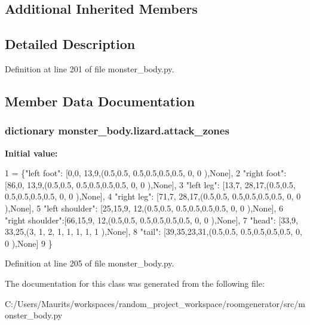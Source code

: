 \subsection*{Additional Inherited Members}


\subsection{Detailed Description}


Definition at line 201 of file monster\+\_\+body.\+py.



\subsection{Member Data Documentation}
\hypertarget{classmonster__body_1_1lizard_a5a110c2e0fc9241d947825096ded2d92}{}
\subsubsection[{attack\+\_\+zones}]{\setlength{\rightskip}{0pt plus 5cm}dictionary monster\+\_\+body.\+lizard.\+attack\+\_\+zones\hspace{0.3cm}{\ttfamily [static]}}\label{classmonster__body_1_1lizard_a5a110c2e0fc9241d947825096ded2d92}
{\bfseries Initial value\+:}
\begin{DoxyCode}
1 = \{\textcolor{stringliteral}{"left foot"}:     [0,0,  13,9,(0.5,0.5, 0.5,0.5,0.5,0.5,  0,  0  ),\textcolor{keywordtype}{None}],
2                   \textcolor{stringliteral}{"right foot"}:    [86,0, 13,9,(0.5,0.5, 0.5,0.5,0.5,0.5,  0,  0  ),\textcolor{keywordtype}{None}],
3                   \textcolor{stringliteral}{"left leg"}:      [13,7, 28,17,(0.5,0.5, 0.5,0.5,0.5,0.5,  0,  0 ),\textcolor{keywordtype}{None}],
4                   \textcolor{stringliteral}{"right leg"}:     [71,7, 28,17,(0.5,0.5, 0.5,0.5,0.5,0.5,  0,  0 ),\textcolor{keywordtype}{None}],
5                   \textcolor{stringliteral}{"left shoulder"}: [25,15,9, 12,(0.5,0.5, 0.5,0.5,0.5,0.5,  0,  0 ),\textcolor{keywordtype}{None}],
6                   \textcolor{stringliteral}{"right shoulder"}:[66,15,9, 12,(0.5,0.5, 0.5,0.5,0.5,0.5,  0,  0 ),\textcolor{keywordtype}{None}],
7                   \textcolor{stringliteral}{"head"}:          [33,9, 33,25,(3,  1,   2,  1,  1,  1,    1,  1 ),\textcolor{keywordtype}{None}],
8                   \textcolor{stringliteral}{"tail"}:          [39,35,23,31,(0.5,0.5, 0.5,0.5,0.5,0.5,  0,  0 ),\textcolor{keywordtype}{None}]
9                   \}
\end{DoxyCode}


Definition at line 205 of file monster\+\_\+body.\+py.



The documentation for this class was generated from the following file\+:\begin{DoxyCompactItemize}
\item 
C\+:/\+Users/\+Maurits/workspaces/random\+\_\+project\+\_\+workspace/roomgenerator/src/monster\+\_\+body.\+py\end{DoxyCompactItemize}
